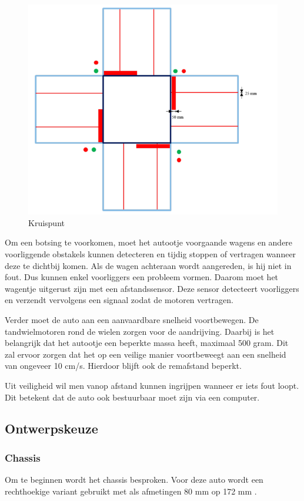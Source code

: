 \documentclass[a4paper,twoside,kulak]{kulakreport} %
\begin{document}
\begin{figure}
	\centering
	\includegraphics[width=.6\textwidth]{volglijnenEnStoplijnen}
	\caption{Kruispunt}
	\label{fig:plattegrond}
\end{figure}

Om een botsing te voorkomen, moet het autootje voorgaande wagens en andere voorliggende obstakels kunnen detecteren en tijdig stoppen of vertragen wanneer deze te dichtbij komen. Als de wagen achteraan wordt aangereden, is hij niet in fout. Dus kunnen enkel voorliggers een probleem vormen. Daarom moet het wagentje uitgerust zijn met een afstandssensor. Deze sensor detecteert voorliggers en verzendt vervolgens een signaal zodat de motoren vertragen. 

Verder moet de auto aan een aanvaardbare snelheid voortbewegen. De tandwielmotoren rond de wielen zorgen voor de aandrijving. Daarbij is het belangrijk dat het autootje een beperkte massa heeft, maximaal 500 gram. Dit zal ervoor zorgen dat het op een veilige manier voortbeweegt aan een snelheid van ongeveer 10 cm/s. Hierdoor blijft ook de remafstand beperkt.

Uit veiligheid wil men vanop afstand kunnen ingrijpen wanneer er iets fout loopt. Dit betekent dat de auto ook bestuurbaar moet zijn via een computer. 



\subsection{Ontwerpskeuze}
\label{Ontwerpskeuze}

\subsubsection{Chassis}
Om te beginnen wordt het chassis besproken. Voor deze auto wordt een rechthoekige variant gebruikt met als afmetingen 80 mm op 172 mm  \cite{RobotChassisRechthoekigZwart}. 
\end{document}
